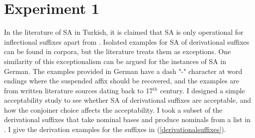 



\section{Experiment 1}

In the literature of SA in Turkish, it is claimed that SA is only operational for inflectional suffixes \citep{orgun1995flat,kornfilt1996some,broadwell2008turkish, kornfilt2012revisiting} apart from \citet{akkucs2016suspended}. Isolated examples for SA of derivational suffixes can be found in corpora, but the literature treats them as exceptions. One similarity of this exceptionalism can be argued for the instances of SA in German. The examples provided in German \citep{pounder2006broken} have a dash "-" character at word endings where the suspended affix should be recovered, and the examples are from written literature sources dating back to 17$^{th}$ century. I designed a simple acceptability study to see whether SA of derivational suffixes are acceptable, and how the conjoiner choice affects the acceptability. I took a subset of the derivational suffixes that take nominal bases and produce nominals from a list in \citet{goksel2004turkish}. I give the derivation examples for the suffixes in (\ref{derivationalsuffixes}).  


